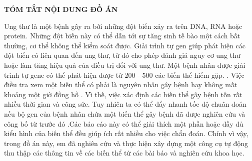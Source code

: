\documentclass[../DoAn.tex]{subfiles}
\begin{document}
\begin{center}
    \Large{\textbf{TÓM TẮT NỘI DUNG ĐỒ ÁN}}\\
\end{center}
\vspace{1cm}
Ung thư là một bệnh gây ra bởi những đột biến xảy ra trên DNA, RNA hoặc protein. Những đột biến này có thể dẫn tới sự tăng sinh tế bào một cách bất thường, cơ thể không thể kiểm soát được. Giải trình tự gen giúp phát hiện các đột biến có liên quan đến ung thư, từ đó cho phép đánh giá nguy cơ ung thư hoặc làm tăng hiệu quả của điều trị đối với ung thư. Một bệnh nhân được giải trình tự gene có thể phát hiện được từ 200 - 500 các biến thể hiếm gặp. \cite{1_JC_Taylor} \cite{2_monkol}. Việc điều tra xem một biến thể có phải là nguyên nhân gây bệnh hay không mất khoảng một giờ đồng hồ \cite{3_Dewey}. Vì thế, việc xác định các biến thể  gây bệnh tốn rất nhiều thời gian và công sức. Tuy nhiên ta có thể đẩy nhanh tốc độ chuân đoán nếu bộ gen của bệnh nhân chứa một biến thể gây bệnh đã được nghiên cứu và công bố từ trước đó .Các báo cáo này có thể giải thích một phần hoặc đầy đủ kiểu hình của biến thể đều giúp ích rất nhiều cho việc chẩn đoán.
Chính vì vậy, trong đồ án này, em đã nghiên cứu và thực hiện xây dựng một công cụ tự động thu thập các thông tin về các biến thể từ các bài báo và nghiên cứu khoa học.
\end{document}
